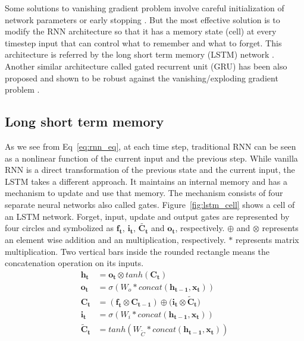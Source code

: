 \documentclass[10pt,twocolumn,letterpaper]{article}
\begin{document}
Some solutions to vanishing gradient problem involve 
careful initialization of network parameters or  early stopping  \cite{DBLP:journals/corr/abs-1211-5063}. But the most effective solution is 
to modify the RNN architecture so that it has a memory state (cell) at every timestep input  that can control what to remember and what to forget. This architecture is referred by the 
long short term memory (LSTM) network \cite{Hochreiter:1997:LSM:1246443.1246450}. Another similar architecture called gated recurrent unit (GRU) has been also proposed and shown to be robust
against the 
vanishing/exploding gradient problem \cite{DBLP:journals/corr/ChoMGBSB14}.

\subsection{Long short term memory} \label{lstm_sec}
As we see from Eq~\ref{eq:rnn_eq}, at each time step, traditional RNN can be 
seen as a nonlinear function of the current input and the previous step. While vanilla RNN is a 
direct transformation of the previous state and the current input, the 
LSTM takes a different approach. It maintains an internal memory and  has a 
mechanism to update and use that memory. The mechanism consists of four separate neural networks also 
called gates. Figure~\ref{fig:lstm_cell} shows a cell of an LSTM network.
Forget, input, update and output gates are represented by four circles and symbolized as $\mathbf{f_t}$, $\mathbf{i_t}$, $\mathbf{\tilde{C_t}}$ and $\mathbf{o_t}$, respectively. $\oplus$ and $\otimes$ represents an element wise addition and an multiplication, 
respectively. $*$ represents matrix multiplication. Two vertical bars inside the rounded rectangle means the 
concatenation operation on its inputs. 
\begin{equation}
\label{eq:lstm_eq}
	\begin{aligned}
		\mathbf{h_t} &= \mathbf{o_t} \otimes tanh(\mathbf{C_t}) \\
		\mathbf{o_t} &= \sigma(W_o * concat(\mathbf{h_{t-1}}, \mathbf{x_t})) \\
		\mathbf{C_t} &= (\mathbf{f_t} \otimes \mathbf{C_{t-1}}) \oplus (\mathbf{i_t} \otimes \mathbf{\tilde{C}_t)}  \\
		\mathbf{i_t} &= \sigma(W_i * concat(\mathbf{h_{t-1}}, \mathbf{x_t})) \\
		\mathbf{\tilde{C}_t} &= tanh(W_{\tilde{C}} * concat(\mathbf{h_{t-1}}, \mathbf{x_t}))
	\end{aligned}
\end{equation}
\end{document}
